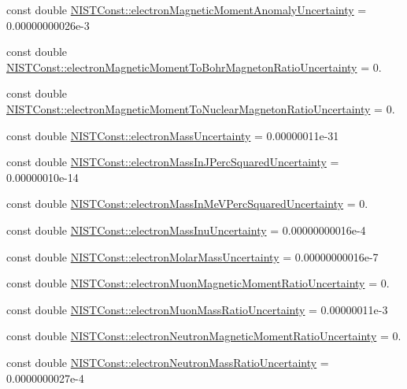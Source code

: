 \begin{DoxyCompactItemize}
\item 
const double \hyperlink{group___electron_gaa969c8b38343f0906e12da4cb803ad68}{N\+I\+S\+T\+Const\+::electron\+Magnetic\+Moment\+Anomaly\+Uncertainty} = 0.\+00000000026e-\/3
\item 
const double \hyperlink{group___electron_ga330a6a13f184692a63aeb4d32e4f078b}{N\+I\+S\+T\+Const\+::electron\+Magnetic\+Moment\+To\+Bohr\+Magneton\+Ratio\+Uncertainty} = 0.
\item 
const double \hyperlink{group___electron_gaef21c4a5c3acb2839194d7ad221ab91c}{N\+I\+S\+T\+Const\+::electron\+Magnetic\+Moment\+To\+Nuclear\+Magneton\+Ratio\+Uncertainty} = 0.
\item 
const double \hyperlink{group___electron_ga558edc70a085ccbed99ad3e485b8abda}{N\+I\+S\+T\+Const\+::electron\+Mass\+Uncertainty} = 0.\+00000011e-\/31
\item 
const double \hyperlink{group___electron_ga618a0b2f35db66864a956a941c6491de}{N\+I\+S\+T\+Const\+::electron\+Mass\+In\+J\+Perc\+Squared\+Uncertainty} = 0.\+00000010e-\/14
\item 
const double \hyperlink{group___electron_ga9c3afb804f3846bec7340c098aed401e}{N\+I\+S\+T\+Const\+::electron\+Mass\+In\+Me\+V\+Perc\+Squared\+Uncertainty} = 0.
\item 
const double \hyperlink{group___electron_ga8f8888c07573f5b4f8c1ebb553383592}{N\+I\+S\+T\+Const\+::electron\+Mass\+Inu\+Uncertainty} = 0.\+00000000016e-\/4
\item 
const double \hyperlink{group___electron_gadea683a9751b639f6d3375df24458b23}{N\+I\+S\+T\+Const\+::electron\+Molar\+Mass\+Uncertainty} = 0.\+00000000016e-\/7
\item 
const double \hyperlink{group___electron_ga57b643cd9b1f9dd4199592ca13a2f2eb}{N\+I\+S\+T\+Const\+::electron\+Muon\+Magnetic\+Moment\+Ratio\+Uncertainty} = 0.
\item 
const double \hyperlink{group___electron_ga7e23872fb8b3c8d61b957580f9c35197}{N\+I\+S\+T\+Const\+::electron\+Muon\+Mass\+Ratio\+Uncertainty} = 0.\+00000011e-\/3
\item 
const double \hyperlink{group___electron_ga0831234ba4a3e050f3def6928140287e}{N\+I\+S\+T\+Const\+::electron\+Neutron\+Magnetic\+Moment\+Ratio\+Uncertainty} = 0.
\item 
const double \hyperlink{group___electron_gad43c7267105ded23b41ec9afcefdd19d}{N\+I\+S\+T\+Const\+::electron\+Neutron\+Mass\+Ratio\+Uncertainty} = 0.\+0000000027e-\/4
\item 

\end{DoxyCompactItemize}
